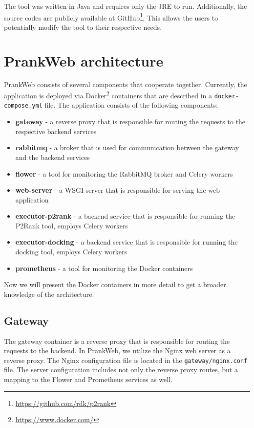 The tool was written in Java and requires only the JRE to run. Additionally, the source codes are publicly available at GitHub\footnote{\url{https://github.com/rdk/p2rank}}. This allows the users to potentially modify the tool to their respective needs. 

\section{PrankWeb architecture}

PrankWeb consists of several components that cooperate together. Currently, the application is deployed via Docker\footnote{\url{https://www.docker.com/}} containers that are described in a \texttt{docker-compose.yml} file. The application consists of the following components:

\begin{itemize}
    \item \textbf{gateway} - a reverse proxy that is responsible for routing the requests to the respective backend services
    \item \textbf{rabbitmq} - a broker that is used for communication between the gateway and the backend services
    \item \textbf{flower} - a tool for monitoring the RabbitMQ broker and Celery workers
    \item \textbf{web-server} - a WSGI server that is responsible for serving the web application
    \item \textbf{executor-p2rank} - a backend service that is responsible for running the P2Rank tool, employs Celery workers
    \item \textbf{executor-docking} - a backend service that is responsible for running the docking tool, employs Celery workers 
    \item \textbf{prometheus} - a tool for monitoring the Docker containers 
\end{itemize}

Now we will present the Docker containers in more detail to get a broader knowledge of the architecture.

\subsection{Gateway}

The gateway container is a reverse proxy that is responsible for routing the requests to the backend. In PrankWeb, we utilize the Nginx web server as a reverse proxy. The Nginx configuration file is located in the \texttt{gateway/nginx.conf} file. The server configuration includes not only the reverse proxy routes, but a mapping to the Flower and Prometheus services as well.

